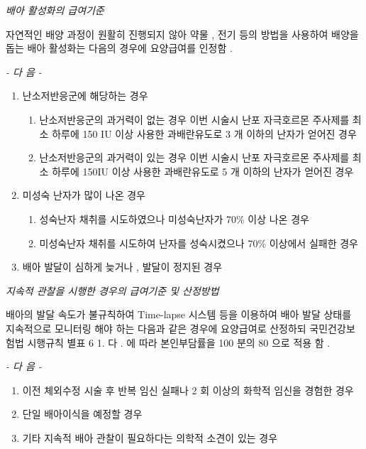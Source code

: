 \par
\emph{배아 활성화의 급여기준}\par
자연적인 배양 과정이 원활히 진행되지 않아 약물 ,  전기 등의  방법을 사용하여 배양을 돕는 배아 활성화는  다음의 경우에 요양급여를 인정함 . \par
\emph{-  다 음  -}\par  
\begin{enumerate}[가.]\tightlist
\item 난소저반응군에 해당하는 경우 
	\begin{enumerate}[1)]\tightlist
	\item 난소저반응군의 과거력이 없는 경우 이번 시술시 난포 자극호르몬 주사제를 최소 하루에  150 IU  이상 사용한  과배란유도로  3 개 이하의 난자가 얻어진 경우 
	\item 난소저반응군의 과거력이 있는 경우 이번 시술시 난포 자극호르몬 주사제를 최소 하루에  150IU  이상 사용한 과배란유도로  5 개 이하의 난자가 얻어진 경우 
	\end{enumerate}
\item 미성숙 난자가 많이 나온 경우 
	\begin{enumerate}[1)]\tightlist
	\item 성숙난자 채취를 시도하였으나 미성숙난자가  70\%  이상 나온 경우 
	\item 미성숙난자 채취를 시도하여 난자를 성숙시켰으나  70\%  이상에서 실패한 경우 
	\end{enumerate}
\item 배아 발달이 심하게 늦거나 ,  발달이 정지된 경우 
\end{enumerate} 

\emph{지속적 관찰을 시행한 경우의 급여기준 및 산정방법} \par
배아의 발달 속도가 불규칙하여  Time-lapse  시스템 등을 이용하여 배아 발달 상태를 지속적으로 모니터링 해야 하는 다음과  같은 경우에 요양급여로 산정하되 국민건강보험법 시행규칙 별표 6 1. 다 . 에  따라 본인부담률을  100 분의  80 으로 적용 함 . \par
\emph{-  다 음  -}\par 
\begin{enumerate}[가.]\tightlist
\item 이전 체외수정 시술 후 반복 임신 실패나  2 회 이상의 화학적  임신을 경험한 경우 
\item 단일 배아이식을 예정할 경우 
\item 기타 지속적 배아 관찰이 필요하다는 의학적 소견이 있는 경우 
\end{enumerate} 

